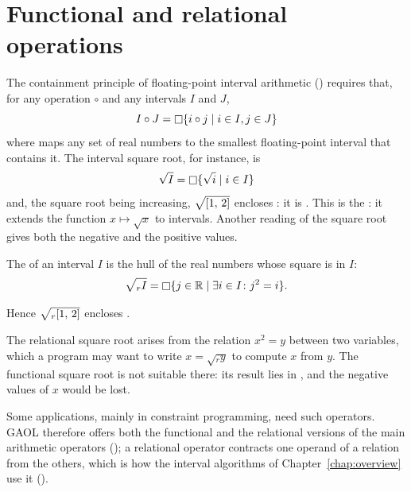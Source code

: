 \section{Functional and relational operations}\label{sec:arithmetic-kinds}
%

The containment principle of floating-point interval arithmetic
() requires that, for any operation $\circ$ and any
intervals $I$ and $J$,
\begin{equation*}
I\circ J=\mathop{\Box} \{i\circ j\mid i\in I, j\in J\}
\end{equation*}
where \hull{} maps any set of real numbers to the smallest floating-point
interval that contains it. The interval square root, for instance, is
\begin{equation*}
\sqrt{I}=\mathop{\Box} \{\sqrt{i}\mid i\in I\}
\end{equation*}
and, the square root being increasing, $\sqrt{[1,\,2]}$ encloses
: it is .
This is the : it extends the function
$x\mapsto\sqrt{x}$ to intervals. Another reading of the square root gives
both the negative and the positive values.

\begin{Def}\label{def:arithmetic-relational-sqrt}
The  of an interval $I$ is the hull of the real
numbers whose square is in $I$:
\begin{equation*}
\sqrt{_rI}=\mathop{\Box} \{j\in\mathbb{R}\mid\exists i\in I\colon j^2=i\}.
\end{equation*}
\end{Def}

\noindent Hence $\sqrt{_r[1,\,2]}$ encloses .

\begin{Ex}
The relational square root arises from the relation $x^2=y$ between two
variables, which a program may want to write $x=\sqrt{_ry}$ to compute $x$
from $y$. The functional square root is not suitable there: its result lies
in , and the negative values of $x$ would be lost.
\end{Ex}

Some applications, mainly in constraint programming, need such operators.
GAOL therefore offers both the functional and the relational versions of the
main arithmetic operators (); a relational
operator contracts one operand of a relation from the others, which is how
the interval algorithms of Chapter~\ref{chap:overview} use it
().

